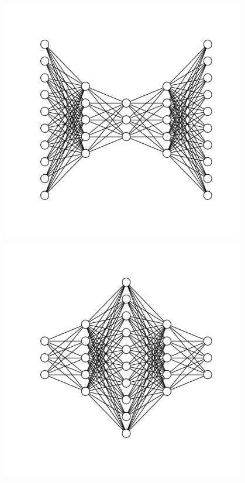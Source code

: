 \documentclass[12pt]{article}
\begin{document}
\begin{flushleft}
\begin{itemize}
\begin{figure}[ht]
\begin{minipage}{0.24\linewidth}
\includegraphics[width=0.95\textwidth]{convex-eg.png}
\end{minipage}
\begin{minipage}{0.24\linewidth}
\centering
\includegraphics[width=0.95\textwidth]{concave-eg.png}
\end{minipage}

\end{figure}
\end{itemize}
\end{flushleft}
\end{document}

